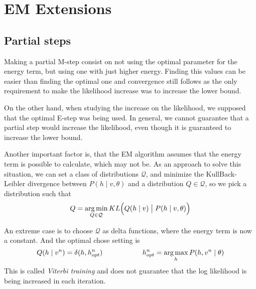 \section{EM Extensions}

\subsection{Partial steps}

Making a partial M-step consist on not using the optimal parameter for the energy term, but using one with just higher energy. Finding this values can be easier than finding the optimal one and convergence still follows as the only requirement to make the likelihood increase was to increase the lower bound.

On the other hand, when studying the increase on the likelihood, we supposed that the optimal E-step was being used. In general, we cannot guarantee that a partial step would increase the likelihood, even though it is guaranteed to increase the lower bound.

Another important factor is, that the EM algorithm assumes that the energy term is possible to calculate, which may not be. As an approach to solve this situation, we can set a class of distributions \(\mathcal{Q}\), and minimize the KullBack-Leibler divergence between \(P(h \mid v, \theta)\) and a distribution \(Q \in \mathcal{Q}\), so we pick a distribution such that
\[
  Q = \operatorname*{arg\,min}_{Q \in \mathcal{Q}} KL\Big(Q(h \mid v) \bigm| P(h\mid v, \theta)\Big)
\]

An extreme case is to choose \(\mathcal{Q}\) as delta functions, where the energy term is now a constant. And the optimal chose setting is
\[
Q(h \mid v^{n}) = \delta (h, h^{n}_{opt}) \hspace{2cm} h^{n}_{opt} = \operatorname*{arg\,max}_{h}P(h , v^{n} \mid \theta)
\]
This is called \emph{Viterbi training} and does not guarantee that the log likelihood is being increased in each iteration.
